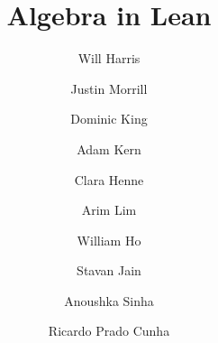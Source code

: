 \title{Algebra in Lean}
\author{Will Harris \and Justin Morrill \and Dominic King \and Adam Kern \and Clara Henne \and Arim Lim \and William Ho \and Stavan Jain \and Anoushka Sinha \and Ricardo Prado Cunha}


\maketitle


